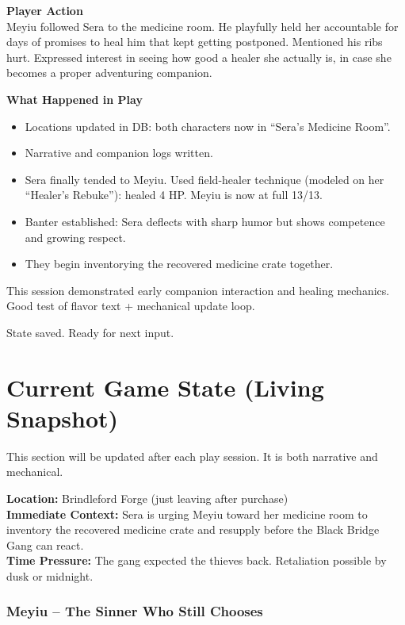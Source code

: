 \documentclass[11pt,a4paper]{article}
\begin{document}
\textbf{Player Action}\\
Meyiu followed Sera to the medicine room. He playfully held her accountable for days of promises to heal him that kept getting postponed. Mentioned his ribs hurt. Expressed interest in seeing how good a healer she actually is, in case she becomes a proper adventuring companion.

\textbf{What Happened in Play}\\
\begin{itemize}
  \item Locations updated in DB: both characters now in ``Sera's Medicine Room''.
  \item Narrative and companion logs written.
  \item Sera finally tended to Meyiu. Used field-healer technique (modeled on her ``Healer's Rebuke''): healed 4 HP. Meyiu is now at full 13/13.
  \item Banter established: Sera deflects with sharp humor but shows competence and growing respect.
  \item They begin inventorying the recovered medicine crate together.
\end{itemize}

This session demonstrated early companion interaction and healing mechanics. Good test of flavor text + mechanical update loop.

State saved. Ready for next input.

\section{Current Game State (Living Snapshot)}

This section will be updated after each play session. It is both narrative and mechanical.

\begin{tcolorbox}[colback=storybg, colframe=nerdgreen, title=Current Save Point]
\textbf{Location:} Brindleford Forge (just leaving after purchase)\\
\textbf{Immediate Context:} Sera is urging Meyiu toward her medicine room to inventory the recovered medicine crate and resupply before the Black Bridge Gang can react.\\
\textbf{Time Pressure:} The gang expected the thieves back. Retaliation possible by dusk or midnight.
\end{tcolorbox}

\subsubsection*{Meyiu -- The Sinner Who Still Chooses}
\end{document}
